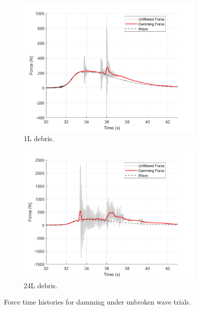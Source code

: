 \documentclass{article}
\begin{document}
\begin{figure}[h!]
    \centering
    \begin{subfigure}{0.48\textwidth}
        \includegraphics[width=\linewidth]{Reg_Lift_U_1_L_D__Masters_NHERIDeprisImpact2_goodtests_Reg_Lift_U_1_L_Trial04_Damming.png}
        \caption{1L debris.}
    \end{subfigure}
    \hfill
    \begin{subfigure}{0.48\textwidth}
        \includegraphics[width=\linewidth]{Reg_Lift_U_24_L_D__Masters_NHERIDeprisImpact2_goodtests_Reg_Lift_U_24_L_Trial04_Damming.png}
        \caption{24L debris.}
    \end{subfigure}
    \caption{Force time histories for damming under unbroken wave trials.}
    \label{fig:timehist_unbroken_damming}
\end{figure}
\end{document}
